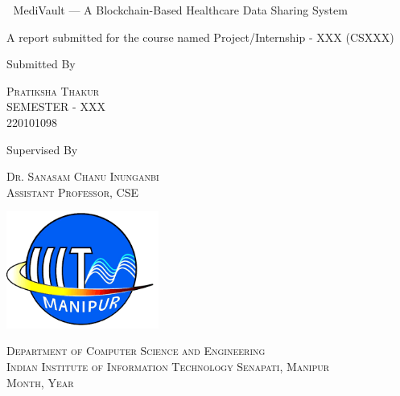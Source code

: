\documentclass[a4paper, 11pt, oneside]{report}
\begin{document}
 	
	\begin{titlepage} 
		
		\centering 
		
		\vspace*{\baselineskip} 
		
		\vspace{0.75\baselineskip}
		
		{\LARGE 🌿 MediVault — A Blockchain-Based Healthcare Data Sharing System}
		
		\vspace{0.75\baselineskip}
		
		\vspace{2\baselineskip}

		A report submitted for the course named Project/Internship - XXX (CSXXX)
		
		\vspace*{7\baselineskip}
		
		Submitted By
		
		\vspace{0.5\baselineskip}
		
		{\scshape\Large Pratiksha Thakur\\ SEMESTER - XXX \\ 220101098}
		
		\vspace{0.5\baselineskip}
		
		Supervised By
		
		\vspace{0.5\baselineskip}
		
		{\scshape\Large Dr. Sanasam Chanu Inunganbi \\ Assistant Professor, CSE}
		
		\vspace{0.5\baselineskip}
		
		\vfill
		
		\begin{center}
			\includegraphics[width=5cm]{report_file/iiit manipur.png}
		\end{center}
	
	{\scshape\small Department of Computer Science and Engineering\\ Indian Institute of Information Technology Senapati, Manipur \\ Month, Year}
	
\end{titlepage}
\end{document}
